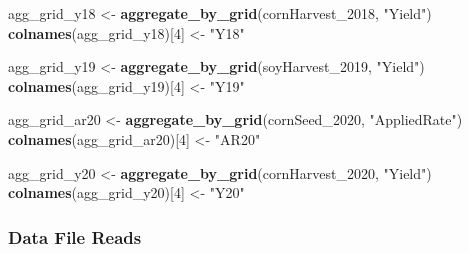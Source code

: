 \documentclass[
]{article}
\newenvironment{Shaded}{\begin{snugshade}}{\end{snugshade}}
\newcommand{\DecValTok}[1]{\textcolor[rgb]{0.00,0.00,0.81}{#1}}
\newcommand{\FunctionTok}[1]{\textcolor[rgb]{0.13,0.29,0.53}{\textbf{#1}}}
\newcommand{\NormalTok}[1]{#1}
\newcommand{\OtherTok}[1]{\textcolor[rgb]{0.56,0.35,0.01}{#1}}
\newcommand{\StringTok}[1]{\textcolor[rgb]{0.31,0.60,0.02}{#1}}
\begin{document}
\begin{Shaded}
\begin{Highlighting}[]
\NormalTok{agg\_grid\_y18  }\OtherTok{\textless{}{-}} \FunctionTok{aggregate\_by\_grid}\NormalTok{(cornHarvest\_2018,  }\StringTok{"Yield"}\NormalTok{)}
\FunctionTok{colnames}\NormalTok{(agg\_grid\_y18)[}\DecValTok{4}\NormalTok{] }\OtherTok{\textless{}{-}} \StringTok{"Y18"}

\NormalTok{agg\_grid\_y19  }\OtherTok{\textless{}{-}} \FunctionTok{aggregate\_by\_grid}\NormalTok{(soyHarvest\_2019,   }\StringTok{"Yield"}\NormalTok{)}
\FunctionTok{colnames}\NormalTok{(agg\_grid\_y19)[}\DecValTok{4}\NormalTok{] }\OtherTok{\textless{}{-}} \StringTok{"Y19"}

\NormalTok{agg\_grid\_ar20 }\OtherTok{\textless{}{-}} \FunctionTok{aggregate\_by\_grid}\NormalTok{(cornSeed\_2020,     }\StringTok{"AppliedRate"}\NormalTok{)}
\FunctionTok{colnames}\NormalTok{(agg\_grid\_ar20)[}\DecValTok{4}\NormalTok{] }\OtherTok{\textless{}{-}} \StringTok{"AR20"}

\NormalTok{agg\_grid\_y20  }\OtherTok{\textless{}{-}} \FunctionTok{aggregate\_by\_grid}\NormalTok{(cornHarvest\_2020,  }\StringTok{"Yield"}\NormalTok{)}
\FunctionTok{colnames}\NormalTok{(agg\_grid\_y20)[}\DecValTok{4}\NormalTok{] }\OtherTok{\textless{}{-}} \StringTok{"Y20"}
\end{Highlighting}
\end{Shaded}

\subsubsection{Data File Reads}\label{data-file-reads}
\end{document}
